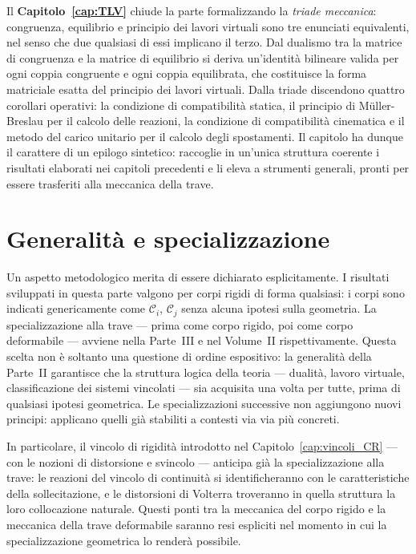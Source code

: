 Il \textbf{Capitolo~\ref{cap:TLV}} chiude la parte formalizzando la \emph{triade
	meccanica}: congruenza, equilibrio e principio dei lavori virtuali sono tre enunciati
equivalenti, nel senso che due qualsiasi di essi implicano il terzo. Dal dualismo tra
la matrice di congruenza e la matrice di equilibrio si deriva un'identità bilineare
valida per ogni coppia congruente e ogni coppia equilibrata, che costituisce la forma
matriciale esatta del principio dei lavori virtuali. Dalla triade discendono quattro
corollari operativi: la condizione di compatibilità statica, il principio di
Müller-Breslau per il calcolo delle reazioni, la condizione di compatibilità
cinematica e il metodo del carico unitario per il calcolo degli spostamenti. Il
capitolo ha dunque il carattere di un epilogo sintetico: raccoglie in un'unica
struttura coerente i risultati elaborati nei capitoli precedenti e li eleva a
strumenti generali, pronti per essere trasferiti alla meccanica della trave.

\section*{Generalità e specializzazione}

Un aspetto metodologico merita di essere dichiarato esplicitamente. I risultati
sviluppati in questa parte valgono per corpi rigidi di forma qualsiasi: i corpi
sono indicati genericamente come $\mathcal{C}_i$, $\mathcal{C}_j$ senza alcuna
ipotesi sulla geometria. La specializzazione alla trave --- prima come corpo rigido,
poi come corpo deformabile --- avviene nella Parte~III e nel Volume~II rispettivamente.
Questa scelta non è soltanto una questione di ordine espositivo: la generalità della
Parte~II garantisce che la struttura logica della teoria --- dualità, lavoro virtuale,
classificazione dei sistemi vincolati --- sia acquisita una volta per tutte, prima
di qualsiasi ipotesi geometrica. Le specializzazioni successive non aggiungono nuovi
principi: applicano quelli già stabiliti a contesti via via più concreti.

In particolare, il vincolo di rigidità introdotto nel
Capitolo~\ref{cap:vincoli_CR} --- con le nozioni di distorsione e svincolo --- anticipa
già la specializzazione alla trave: le reazioni del vincolo di continuità si
identificheranno con le caratteristiche della sollecitazione, e le distorsioni di
Volterra troveranno in quella struttura la loro collocazione naturale. Questi ponti
tra la meccanica del corpo rigido e la meccanica della trave deformabile saranno
resi espliciti nel momento in cui la specializzazione geometrica lo renderà possibile.

